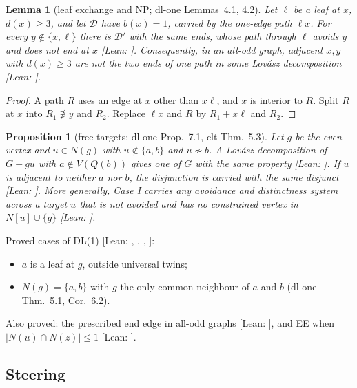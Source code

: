 \documentclass[11pt]{amsart}
\newtheorem{lemma}[theorem]{Lemma}
\newtheorem{proposition}[theorem]{Proposition}
\theoremstyle{definition}
\newcommand{\st}[1]{\textsf{\small[#1]}}
\newcommand{\cD}{\mathcal D}
\begin{document}
\begin{lemma}[leaf exchange and NP; dl-one Lemmas~4.1, 4.2]\label{lem:np}
Let $\ell$ be a leaf at $x$, $d(x)\ge3$, and let $\cD$ have $b(x)=1$, carried by the one-edge path
$\ell x$. For every $y\notin\{x,\ell\}$ there is $\cD'$ with the same ends, whose path through $\ell$
avoids $y$ and does not end at $x$ \st{Lean: }. Consequently, in an all-odd graph,
adjacent $x,y$ with $d(x)\ge3$ are not the two ends of one path in some Lov\'asz decomposition
\st{Lean: }.
\end{lemma}

\begin{proof}
A path $R$ uses an edge at $x$ other than $x\ell$, and $x$ is interior to $R$. Split $R$ at $x$ into
$R_1\not\ni y$ and $R_2$. Replace $\ell x$ and $R$ by $R_1+x\ell$ and $R_2$.
\end{proof}

\begin{proposition}[free targets; dl-one Prop.~7.1, clt Thm.~5.3]\label{prop:free}
Let $g$ be the even vertex and $u\in N(g)$ with $u\notin\{a,b\}$ and $u\not\sim b$. A Lov\'asz
decomposition of $G-gu$ with $a\notin V(Q(b))$ gives one of $G$ with the same property
\st{Lean: }. If $u$ is adjacent to neither $a$ nor $b$, the disjunction is
carried with the same disjunct \st{Lean: }. More generally, Case I carries any
avoidance and distinctness system across a target $u$ that is not avoided and has no constrained vertex
in $N[u]\cup\{g\}$ \st{Lean: }.
\end{proposition}

Proved cases of DL(1) \st{Lean: , , \lean{avoid_deg_two},
\lean{disjL1_deg_two}}:
\begin{itemize}[leftmargin=*]
\item $a$ is a leaf at $g$, outside universal twins;
\item $N(g)=\{a,b\}$ with $g$ the only common neighbour of $a$ and $b$ (dl-one Thm.~5.1, Cor.~6.2).
\end{itemize}
Also proved: the prescribed end edge in all-odd graphs \st{Lean: }, and EE when
$|N(u)\cap N(z)|\le1$ \st{Lean: }.

\subsection{Steering}\label{sec:steer}
\end{document}
